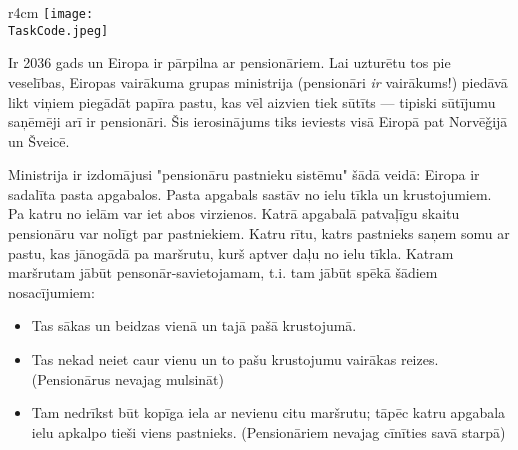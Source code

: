 \documentclass{boi2014-lv}
\renewcommand{\TaskCode}{postmen}
\begin{document}
    \begin{wrapfigure}[8]{r}{4cm}
        \vspace{-18pt}
		\texttt{[image: \\TaskCode.jpeg]}
	\end{wrapfigure}
    Ir 2036 gads un Eiropa ir pārpilna ar pensionāriem. Lai uzturētu tos pie veselības, Eiropas vairākuma grupas ministrija (pensionāri \emph{ir} vairākums!) piedāvā likt viņiem piegādāt papīra pastu, kas vēl aizvien tiek sūtīts --- tipiski sūtījumu saņēmēji arī ir pensionāri. Šis ierosinājums tiks ieviests visā Eiropā pat Norvē\v{g}ijā un Šveicē.

		Ministrija ir izdomājusi "pensionāru pastnieku sistēmu" šādā veidā: Eiropa ir sadalīta pasta apgabalos. Pasta apgabals sastāv no ielu tīkla un krustojumiem. Pa katru no ielām var iet abos virzienos. Katrā apgabalā patvaļīgu skaitu pensionāru var nolīgt par pastniekiem. Katru rītu, katrs pastnieks saņem somu ar pastu, kas jānogādā pa maršrutu, kurš aptver daļu no ielu tīkla. Katram maršrutam jābūt pensonār-savietojamam, t.i. tam jābūt spēkā šādiem nosacījumiem:

    \begin{itemize}
        \item Tas sākas un beidzas vienā un tajā pašā krustojumā. %
        \item Tas nekad neiet caur vienu un to pašu krustojumu vairākas reizes. (Pensionārus nevajag mulsināt)%
        \item Tam nedrīkst būt kopīga iela ar nevienu citu maršrutu; tāpēc katru apgabala ielu apkalpo tieši viens pastnieks. (Pensionāriem nevajag cīnīties savā starpā) %
    \end{itemize}
\end{document}
